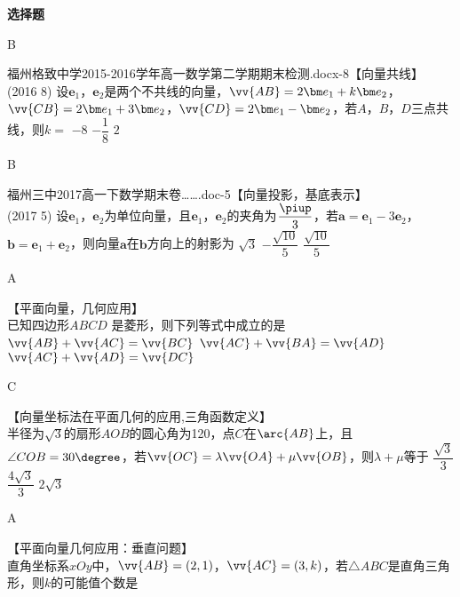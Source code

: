 \begin{exercise}{\bf 选择题}
      \begin{answer}
        B
      \end{answer}
    \item 福州格致中学2015-2016学年高一数学第二学期期末检测.docx-8【向量共线】\\
      (2016  8)
      设$\bm e_1$，$\bm e_2$是两个不共线的向量，$\vv{AB}=2\bm e_1+k\bm e_2$，$\vv{CB}=2\bm e_1+3\bm e_2$，$\vv{CD}=2\bm e_1-\bm e_2$，若$A$，$B$，$D$三点共线，则$k=$\xz
        {$-8$}
        {$-\dfrac18$}
        {$2$}
      \begin{answer}
        B
      \end{answer}
    \item 福州三中2017高一下数学期末卷…….doc-5【向量投影，基底表示】\\
      (2017  5)
      设$\bm e_1$，$\bm e_2$为单位向量，且$\bm e_1$，$\bm e_2$的夹角为$\dfrac{\piup}3$，若$\bm a=\bm e_1-3\bm e_2$，$\bm b=\bm e_1+\bm e_2$，则向量$\bm a$在$\bm b$方向上的射影为\xz
       {$\sqrt3$}
       {$-\dfrac{\sqrt{10}}5$}
       {$\dfrac{\sqrt{10}}5$}
      \begin{answer}
        A
      \end{answer}
    \item 【平面向量，几何应用】\\
      已知四边形$ABCD$ 是菱形，则下列等式中成立的是\xz
        {$\vv{AB}+\vv{AC}=\vv{BC}$}
        {$\vv{AC}+\vv{BA}=\vv{AD}$}
        {$\vv{AC}+\vv{AD}=\vv{DC}$}
      \begin{answer}
        C
      \end{answer}
    \item 【向量坐标法在平面几何的应用,三角函数定义】\\
      半径为$\sqrt{3}$的扇形$AOB$的圆心角为120\degree，点$C$在$\arc{AB}$上，且$\angle{COB}=30\degree$，若$\vv{OC}=\lambda\vv{OA}+\mu\vv{OB}$，则$\lambda+\mu$等于\xz
       {$\dfrac{\sqrt{3}}3$}
       {$\dfrac{4\sqrt{3}}3$}
       {$2\sqrt{3}$}
      \begin{answer}
        A
      \end{answer}
    \item 【平面向量几何应用：垂直问题】\\
      直角坐标系$xOy$中，$\vv{AB}=(2,1)$，$\vv{AC}=(3,k)$，若$\triangle{ABC}$是直角三角形，则$k$的可能值个数是\xz
      \begin{answer}

\end{answer}
\end{exercise}
